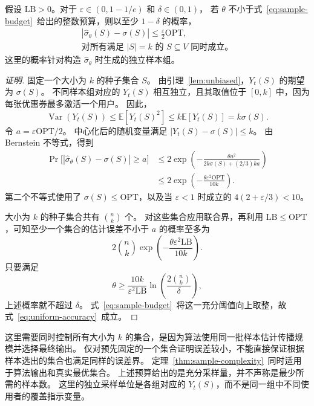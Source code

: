 \begin{theorem}[充分采样量]
\label{thm:sample-complexity}
假设 $\mathrm{LB}>0$。对于 $\varepsilon\in(0,1-1/e)$ 和 $\delta\in(0,1)$，
若 $\theta$ 不小于式~\eqref{eq:sample-budget}~给出的整数预算，则以至少 $1-\delta$ 的概率，
\begin{equation}
\label{eq:uniform-accuracy}
 \begin{gathered}
 \left|\hat\sigma_\theta(S)-\sigma(S)\right|
 \le\frac{\varepsilon}{2}\mathrm{OPT},\\
 \text{对所有满足 } |S|=k \text{ 的 } S\subseteq V \text{ 同时成立。}
 \end{gathered}
\end{equation}
这里的概率针对构造 $\hat\sigma_\theta$ 时生成的独立样本组。
\end{theorem}
\begin{proof}[证明]\renewcommand{\qedsymbol}{}
固定一个大小为 $k$ 的种子集合 $S$。
由引理~\ref{lem:unbiased}，$Y_t(S)$ 的期望为 $\sigma(S)$。
不同样本组对应的 $Y_t(S)$ 相互独立，且其取值位于 $[0,k]$ 中，因为每张优惠券最多激活一个用户。
因此，
\[
 \operatorname{Var}(Y_t(S))\le\mathbb E[Y_t(S)^2]
 \le k\mathbb E[Y_t(S)]=k\sigma(S).
\]
令 $a=\varepsilon\mathrm{OPT}/2$。
中心化后的随机变量满足 $|Y_t(S)-\sigma(S)|\le k$。
由 Bernstein 不等式，得到
\begin{align}
\label{eq:bernstein}
 \Pr\bigl[|\hat\sigma_\theta(S)-\sigma(S)|\ge a\bigr]
 &\le 2\exp\left(-\frac{\theta a^2}
 {2k\sigma(S)+(2/3)ka}\right)\nonumber\\
 &\le 2\exp\left(-\frac{\theta\varepsilon^2\mathrm{OPT}}
 {10k}\right).
\end{align}
第二个不等式使用了 $\sigma(S)\le\mathrm{OPT}$，以及当 $\varepsilon<1$ 时成立的
$4(2+\varepsilon/3)<10$。

大小为 $k$ 的种子集合共有 $\binom nk$ 个。
对这些集合应用联合界，再利用 $\mathrm{LB}\le\mathrm{OPT}$，可知至少一个集合的估计误差不小于 $a$ 的概率至多为
\[
 2\binom nk\exp\left(-\frac{\theta\varepsilon^2\mathrm{LB}}
 {10k}\right).
\]
只要满足
\[
 \theta\ge\frac{10k}{\varepsilon^2\mathrm{LB}}
 \ln\left(\frac{2\binom nk}{\delta}\right),
\]
上述概率就不超过 $\delta$。
式~\eqref{eq:sample-budget}~将这一充分阈值向上取整，故式~\eqref{eq:uniform-accuracy}~成立。
\end{proof}

这里需要同时控制所有大小为 $k$ 的集合，是因为算法使用同一批样本估计传播规模并选择最终输出。
仅对预先固定的一个集合证明误差较小，不能直接保证根据样本选出的集合也满足同样的误差界。
定理~\ref{thm:sample-complexity}~同时适用于算法输出和真实最优集合。
上述预算给出的是充分采样量，并不声称是最少所需的样本数。
这里的独立采样单位是各组对应的 $Y_t(S)$，而不是同一组中不同使用者的覆盖指示变量。

